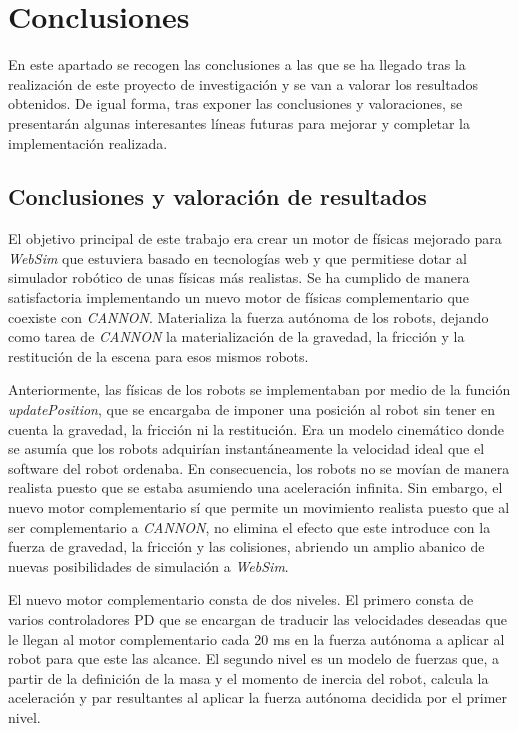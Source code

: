 \chapter{Conclusiones}
\label{chap:conclusiones} 
En este apartado se recogen las conclusiones a las que se ha llegado tras la realización de este proyecto de investigación y se van a valorar los resultados obtenidos. De igual forma, tras exponer las conclusiones y valoraciones, se presentarán algunas interesantes líneas futuras para mejorar y completar la implementación realizada.
   
\section{Conclusiones y valoración de resultados}
El objetivo principal de este trabajo era crear un motor de físicas mejorado para \textit{WebSim} que estuviera basado en tecnologías web y que permitiese dotar al simulador robótico de unas físicas más realistas. Se ha cumplido de manera satisfactoria implementando un nuevo motor de físicas complementario que coexiste con \textit{CANNON}. Materializa la fuerza autónoma de los robots, dejando como tarea de \textit{CANNON} la materialización de la gravedad, la fricción y la restitución de la escena para esos mismos robots.\newline

Anteriormente, las físicas de los robots se implementaban por medio de la función \textit{updatePosition}, que se encargaba de imponer una posición al robot sin tener en cuenta la gravedad, la fricción ni la restitución. Era un modelo cinemático donde se asumía que los robots adquirían instantáneamente la velocidad ideal que el software del robot ordenaba. En consecuencia, los robots no se movían de manera realista puesto que se estaba asumiendo una aceleración infinita. Sin embargo, el nuevo motor complementario sí que permite un movimiento realista puesto que al ser complementario a \textit{CANNON}, no elimina el efecto que este introduce con la fuerza de gravedad, la fricción y las colisiones, abriendo un amplio abanico de nuevas posibilidades de simulación a \textit{WebSim}. \newline 

El nuevo motor complementario consta de dos niveles. El primero consta de varios controladores PD que se encargan de traducir las velocidades deseadas que le llegan al motor complementario cada 20 ms en la fuerza autónoma a aplicar al robot para que este las alcance. El segundo nivel es un modelo de fuerzas que, a partir de la definición de la masa y el momento de inercia del robot, calcula la aceleración y par resultantes al aplicar la fuerza autónoma decidida por el primer nivel.


